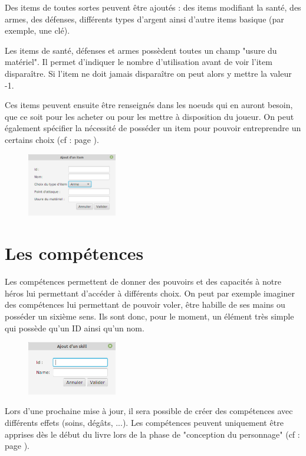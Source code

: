 		Des items de toutes sortes peuvent être ajoutés : des items modifiant la santé, des armes, des défenses, différents types d'argent ainsi d'autre items basique (par exemple, une clé).

		Les items de santé, défenses et armes possèdent toutes un champ "usure du matériel". Il permet d'indiquer le nombre d'utilisation avant de voir l'item disparaître. Si l'item ne doit jamais disparaître on peut alors y mettre la valeur -1.

		Ces items peuvent ensuite être renseignés dans les noeuds qui en auront besoin, que ce soit pour les acheter ou pour les mettre à disposition du joueur. On peut également spécifier la nécessité de posséder un item pour pouvoir entreprendre un certains choix (cf :  page \pageref{sec:prerequis}).

		\begin{figure}[H]
			\centering\includegraphics[width=0.35\textwidth, keepaspectratio]{img/itemDialog.png}
		\end{figure}

	\section{Les compétences}
		\label{sec:skills}

		Les compétences permettent de donner des pouvoirs et des capacités à notre héros lui permettant d'accéder à différents choix. On peut par exemple imaginer des compétences lui permettant de pouvoir voler, être habille de ses mains ou posséder un sixième sens. Ils sont donc, pour le moment, un élément très simple qui possède qu'un ID ainsi qu'un nom.

		\begin{figure}[H]
			\centering\includegraphics[width=0.35\textwidth, keepaspectratio]{img/skillDialog.png}
		\end{figure}

		Lors d'une prochaine mise à jour, il sera possible de créer des compétences avec différents effets (soins, dégâts, ...). Les compétences peuvent uniquement être apprises dès le début du livre lors de la phase de "conception du personnage" (cf :   page \pageref{subsubsec:persoCreationSkill}).
